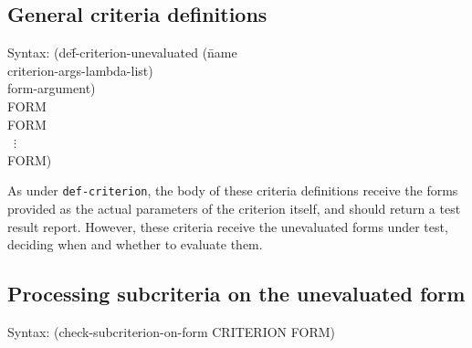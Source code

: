 \subsection{General criteria definitions}
\label{sec:def-criterion-unevaluated}
{\ttfamily\begin{tabbing}
\textrm{Syntax: }(de\=f-criterion-unevaluated (\=name
\\ \>            \>criterion-args-lambda-list)
\\ \>            \>form-argument)
\\ \> FORM
\\ \> FORM
\\ \> ~$\vdots$
\\ \> FORM)
\end{tabbing}}%
As under \texttt{def-criterion}, the body of these criteria
definitions receive the forms provided as the actual parameters of the
criterion itself, and should return a test result report.  However,
these criteria receive the unevaluated forms under test, deciding when
and whether to evaluate them.
% 
% 

\subsection{Processing subcriteria on the unevaluated form}
\label{sec:subcriteria-form}
{\ttfamily\begin{tabbing}
\textrm{Syntax: }(check-subcriterion-on-form CRITERION FORM)
\end{tabbing}}%

